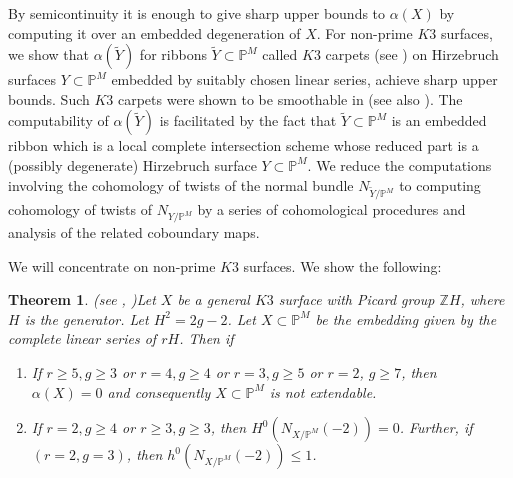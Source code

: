 \documentclass[11pt,twoside]{amsart}
\theoremstyle{plain}
\numberwithin{equation}{section}
\newtheorem{theorem}{Theorem}[section]
\theoremstyle{definition}
\begin{document}
By semicontinuity it is enough to give sharp upper bounds to $\alpha(X)$ by computing it over an embedded degeneration of $X$. For non-prime $K3$ surfaces, we show that $\alpha(\widetilde{Y})$ for ribbons $\widetilde{Y} \subset \mathbb{P}^M$ called $K3$ carpets (see ) on Hirzebruch surfaces $Y \subset \mathbb{P}^M$ embedded by suitably chosen linear series, achieve sharp upper bounds. Such $K3$ carpets were shown to be smoothable in \cite{BMR21} (see also \cite{GP97}). The computability of $\alpha(\widetilde{Y})$ is facilitated by the fact that $\widetilde{Y} \subset \mathbb{P}^M$ is an embedded ribbon which is a local complete intersection scheme whose reduced part is a (possibly degenerate) Hirzebruch surface $Y \subset \mathbb{P}^M$. %
We reduce the computations involving the cohomology of twists of the normal bundle $N_{\widetilde{Y}/\mathbb{P}^M}$ to computing cohomology of twists of $N_{Y/\mathbb{P}^M}$ by a series of cohomological procedures and analysis of the related coboundary maps. \par



We will concentrate on non-prime $K3$ surfaces. We show the following:

\begin{theorem}(see , )\label{non-extendability of K3 surfaces intro}
    Let $X$ be a general $K3$ surface with Picard group $\mathbb{Z}H$, where $H$ is the generator. Let $H^2 = 2g-2$. Let $X \subset \mathbb{P}^M$ be the embedding given by the complete linear series of $rH$. Then if

    \begin{enumerate}
    
        \item[(1)] If $r \geq 5, g \geq 3$ or $r = 4, g \geq 4$ or $r = 3, g \geq 5$ or $r = 2$, $g \geq 7$, then $\alpha(X) = 0$ and consequently $X \subset \mathbb{P}^M$ is not extendable. 
   
        \item[(2)] If $r = 2, g \geq 4$ or $r \geq 3, g \geq 3$, then $H^0(N_{X/\mathbb{P}^M}(-2)) = 0$. Further, if $(r = 2, g = 3)$, then $h^0(N_{X/\mathbb{P}^M}(-2)) \leq 1$.
        
        
    \end{enumerate}
\end{theorem}
\end{document}
